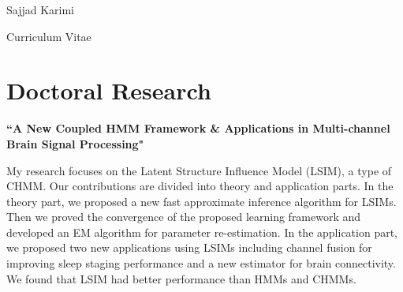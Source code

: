 \documentclass[
	10pt, %
]{FreemanCV}
\begin{document}
\begin{paracol}{2} %


\parbox[][0.11\textheight][c]{\linewidth}{ %
	\centering %
	
	{\sffamily\Huge Sajjad Karimi} %
	
	\medskip %
	
	{\cursivefont\Huge\textcolor{headings}{Curriculum Vitae}}
	
	\vfill %
}


\section{Doctoral Research}

{\raggedright\textbf{``A New Coupled HMM Framework \& Applications in Multi-channel Brain Signal Processing"}\par}

\medskip %

My research focuses on the Latent Structure Influence Model (LSIM), a type of CHMM. Our contributions are divided into theory and application parts. In the theory part, we proposed a new fast approximate inference algorithm for LSIMs. Then we proved the convergence of the proposed learning framework and developed an EM algorithm for parameter re-estimation.
In the application part, we proposed two new applications using LSIMs including channel fusion for improving sleep staging performance and a new estimator for brain connectivity.
We found that LSIM had better performance than HMMs and CHMMs.


\bigskip %



\end{paracol}
\end{document}
